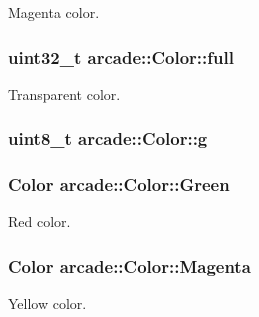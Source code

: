 Magenta color. 

\hypertarget{unionarcade_1_1_color_ad68cc4b72cafa2c89dac97a336d1ca32}{
\subsubsection[{full}]{\setlength{\rightskip}{0pt plus 5cm}uint32\-\_\-t arcade\-::\-Color\-::full}}\label{unionarcade_1_1_color_ad68cc4b72cafa2c89dac97a336d1ca32}


Transparent color. 

\hypertarget{unionarcade_1_1_color_a97c509df99c9b119622f4b2ff8b3f21b}{
\subsubsection[{g}]{\setlength{\rightskip}{0pt plus 5cm}uint8\-\_\-t arcade\-::\-Color\-::g}}\label{unionarcade_1_1_color_a97c509df99c9b119622f4b2ff8b3f21b}
\hypertarget{unionarcade_1_1_color_aa7271d3c9e5fc07926979eaa610af7e4}{
\subsubsection[{Green}]{ {\bf Color} arcade\-::\-Color\-::\-Green\hspace{0.3cm}{\ttfamily [static]}}}\label{unionarcade_1_1_color_aa7271d3c9e5fc07926979eaa610af7e4}


Red color. 

\hypertarget{unionarcade_1_1_color_aabfdd84cadc61ca458e8122869310631}{
\subsubsection[{Magenta}]{ {\bf Color} arcade\-::\-Color\-::\-Magenta\hspace{0.3cm}{\ttfamily [static]}}}\label{unionarcade_1_1_color_aabfdd84cadc61ca458e8122869310631}


Yellow color. 

